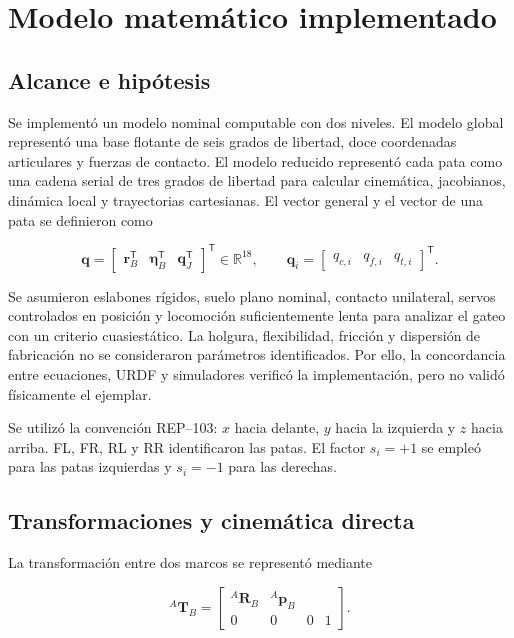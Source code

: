 \chapter{Modelo matemático implementado}

\section{Alcance e hipótesis}

Se implementó un modelo nominal computable con dos niveles. El modelo global
representó una base flotante de seis grados de libertad, doce coordenadas
articulares y fuerzas de contacto. El modelo reducido representó cada pata como
una cadena serial de tres grados de libertad para calcular cinemática,
jacobianos, dinámica local y trayectorias cartesianas. El vector general y el
vector de una pata se definieron como

\begin{equation}
\mathbf q=
\begin{bmatrix}\mathbf r_B^{\mathsf T}&\boldsymbol\eta_B^{\mathsf T}&
\mathbf q_J^{\mathsf T}\end{bmatrix}^{\mathsf T}\in\mathbb R^{18},
\qquad
\mathbf q_i=\begin{bmatrix}q_{c,i}&q_{f,i}&q_{t,i}\end{bmatrix}^{\mathsf T}.
\label{eq:model-levels}
\end{equation}

Se asumieron eslabones rígidos, suelo plano nominal, contacto unilateral,
servos controlados en posición y locomoción suficientemente lenta para analizar
el gateo con un criterio cuasiestático. La holgura, flexibilidad, fricción y
dispersión de fabricación no se consideraron parámetros identificados. Por
ello, la concordancia entre ecuaciones, URDF y simuladores verificó la
implementación, pero no validó físicamente el ejemplar.

Se utilizó la convención REP--103: $x$ hacia delante, $y$ hacia la izquierda y
$z$ hacia arriba. FL, FR, RL y RR identificaron las patas. El factor
$s_i=+1$ se empleó para las patas izquierdas y $s_i=-1$ para las derechas.

\section{Transformaciones y cinemática directa}

La transformación entre dos marcos se representó mediante

\begin{equation}
{}^A\mathbf T_B=
\begin{bmatrix}
{}^A\mathbf R_B & {}^A\mathbf p_B\\
0&0&0&1
\end{bmatrix}.
\label{eq:homogeneous-nova}
\end{equation}

